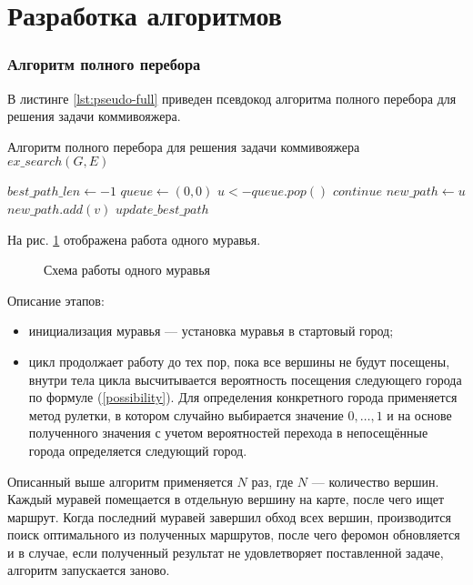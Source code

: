 \documentclass[a4paper,14pt]{extreport}
\newcommand{\imgext}[4] {
	\begin{figure}[h!]
		\center{\texttt{[image: inc/img/\#2.\#3]}}
		\caption{#4}
		\label{img:#2}
	\end{figure}
}
\begin{document}
\section{Разработка алгоритмов}

\subsubsection{Алгоритм полного перебора}

В листинге \ref{lst:pseudo-full} приведен псевдокод алгоритма полного перебора для решения задачи коммивояжера.
\begin{algorithm}
	\caption{\label{lst:pseudo-full}Алгоритм полного перебора для решения задачи коммивояжера $ex\_search(G, E)$}
	\begin{algorithmic}
		\State $best\_path\_len \gets -1$
		\State $queue \gets (0, 0)$
		\State $ u <- queue.pop() $
		\State $continue$
		\EndIf
		\State $ new\_path \gets u $
		\State $ new\_path.add(v) $
		\State $ update\_best\_path $
		\EndFor
		\EndWhile
	\end{algorithmic}
\end{algorithm}

На рис. \ref{img:ant} отображена работа одного муравья.

\imgext{height=90mm}{ant}{pdf}{Схема работы одного муравья}

Описание этапов:
\begin{itemize}
	\item инициализация муравья — установка муравья в стартовый город;
	\item цикл продолжает работу до тех пор, пока все вершины не будут посещены, внутри тела цикла высчитывается вероятность посещения следующего города по формуле (\ref{possibility}). Для определения конкретного города применяется метод рулетки, в котором случайно выбирается значение $ 0, \dots , 1 $ и на основе полученного значения с учетом вероятностей перехода в непосещённые города определяется следующий город.
\end{itemize}

Описанный выше алгоритм применяется $N$ раз, где $N$ — количество вершин.
Каждый муравей помещается в отдельную вершину на карте, после чего ищет маршрут.
Когда последний муравей завершил обход всех вершин, производится поиск оптимального из полученных маршрутов, после чего феромон обновляется и в случае, если полученный результат не удовлетворяет поставленной задаче, алгоритм запускается заново.
\end{document}

